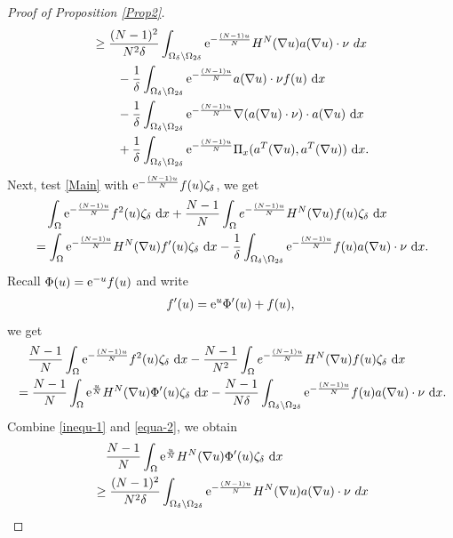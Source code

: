 \documentclass[reqno, 11pt]{amsart} %
\numberwithin{equation}{section}
\theoremstyle{definition}
\newcommand{\e}{\textup{e}}
\newcommand{\dx}{\textup{d}x}
\begin{document}
\begin{proof}[Proof of Proposition \ref{Prop2}]
\begin{align}
        & \geq \frac{(N-1)^2}{N^2 \delta} \int_{\Omega_{\delta} \backslash \Omega_{2\delta}} \e^{-\frac{(N-1)u}{N}} H^N(\nabla u) a(\nabla u) \cdot \nu \ dx \label{inequ-1} \\
        & \qquad -\frac{1}{\delta} \int_{\Omega_{\delta} \backslash \Omega_{2\delta}} \e^{-\frac{(N-1)u}{N}}  a(\nabla u) \cdot \nu f(u)  \ \dx \nonumber\\
        & \qquad -\frac{1}{\delta} \int_{\Omega_{\delta} \backslash \Omega_{2\delta}} \e^{-\frac{(N-1)u}{N}} \nabla (a(\nabla u) \cdot \nu) \cdot a(\nabla u) \ \dx \nonumber \\
        & \qquad  + \frac{1}{\delta} \int_{\Omega_{\delta} \backslash \Omega_{2\delta}} \e^{-\frac{(N-1)u}{N}} \Pi_x( a^T(\nabla u),a^T(\nabla u) ) \ \dx. \nonumber
    \end{align}
    Next, test \eqref{Main} with $\e^{-\frac{(N-1)u}{N}} f(u) \zeta_{\delta}$, we get
    \begin{align*}
        & \quad \int_{\Omega} \e^{-\frac{(N-1)u}{N}} f^2(u) \zeta_{\delta} \ \dx +\frac{N-1}{N} \int_{\Omega} e^{-\frac{(N-1)u}{N}} H^{N}(\nabla u) f(u) \zeta_{\delta} \ \dx \\
        & = \int_{\Omega} \e^{-\frac{(N-1)u}{N}} H^N(\nabla u) f'(u) \zeta_{\delta} \ \dx - \frac{1}{\delta}\int_{\Omega_{\delta}\backslash \Omega_{2\delta}}\e^{-\frac{(N-1)u}{N}} f(u) a(\nabla u) \cdot \nu \ \dx.
     \end{align*}
     Recall $\Phi(u) = \e^{-u} f(u) $ and write
     \begin{align*}
         f'(u) = \e^{u} \Phi'(u) + f(u),
     \end{align*}
     we get
     \begin{align}
        & \quad \frac{N-1}{N}\int_{\Omega} \e^{-\frac{(N-1)u}{N}}  f^2(u) \zeta_{\delta} \ \dx  - \frac{N-1}{N^2} \int_{\Omega} e^{-\frac{(N-1)u}{N}} H^{N}(\nabla u) f(u) \zeta_{\delta} \ \dx  \label{equa-2}\\
        & = \frac{N-1}{N}\int_{\Omega} \e^{\frac{u}{N}} H^N(\nabla u) \Phi'(u) \zeta_{\delta} \ \dx - \frac{N-1}{N\delta}\int_{\Omega_{\delta}\backslash \Omega_{2\delta}}\e^{-\frac{(N-1)u}{N}} f(u) a(\nabla u) \cdot \nu \ \dx. \nonumber
    \end{align}
    Combine \eqref{inequ-1} and \eqref{equa-2}, we obtain
    \begin{align}\label{inequa-2}
       &\quad  \frac{N-1}{N}\int_{\Omega} \e^{\frac{u}{N}} H^N(\nabla u) \Phi'(u) \zeta_{\delta} \ \dx \\
        & \geq \frac{(N-1)^2}{N^2 \delta} \int_{\Omega_{\delta} \backslash \Omega_{2\delta}} \e^{-\frac{(N-1)u}{N}} H^N(\nabla u) a(\nabla u) \cdot \nu \ dx \nonumber \\

\end{align}
\end{proof}
\end{document}
